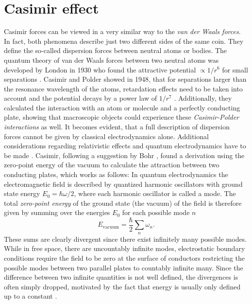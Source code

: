 \chapter{Casimir effect}\label{cha:casimir-effect}

Casimir forces can be viewed in a very similar way to the \textit{van der Waals forces}. In fact, both phenomena describe just two different sides of the same coin. They define the so-called dispersion forces between neutral atoms or bodies.
The quantum theory of van der Waals forces between two neutral atoms was developed by London in 1930 who found the attractive potential $\propto 1/r^6$ for small separations \cite{London_1930}.
Casimir and Polder showed in 1948, that for separations larger than the resonance wavelength of the atoms, retardation effects need to be taken into account and the potential decays by a power law of $1/r^7$ \cite{Casimir_1948a}. 
Additionally, they calculated the interaction with an atom or molecule and a perfectly conducting plate, showing that macroscopic objects could experience these \emph{Casimir-Polder interactions} as well.
It becomes evident, that a full description of dispersion forces cannot be given by classical electrodynamics alone. Additional considerations regarding relativistic effects and quantum electrodynamics have to be made \cite{Bordag_2001,Klimchitskaya_2009,Lamoreaux_2004}.
Casimir, following a suggestion by Bohr \cite{Bordag_1999}, found a derivation using the zero-point energy of the vacuum to calculate the attraction between two conducting plates, which works as follows:
In quantum electrodynamics the electromagnetic field is described by quantized harmonic oscillators with ground state energy $E_0 = \hbar\omega/2$, where each harmonic oscillator is called a mode.
The total \textit{zero-point energy} of the ground state (the vacuum) of the field is therefore given by summing over the energies $E_0$ for each possible mode $n$
\begin{equation}
  E_\mathrm{vacuum} = \frac{\hbar}{2} \sum_n \omega_n.
\end{equation} 
These sums are clearly divergent since there exist infinitely many possible modes.
While in free space, there are uncountably infinite modes, electrostatic boundary conditions require the field to be zero at the surface of conductors restricting the possible modes between two parallel plates to countably infinite many.
Since the difference between two infinite quantities is not well defined, the divergences is often simply dropped, motivated by the fact that energy is usually only defined up to a constant \cite{Bordag_2001}.
